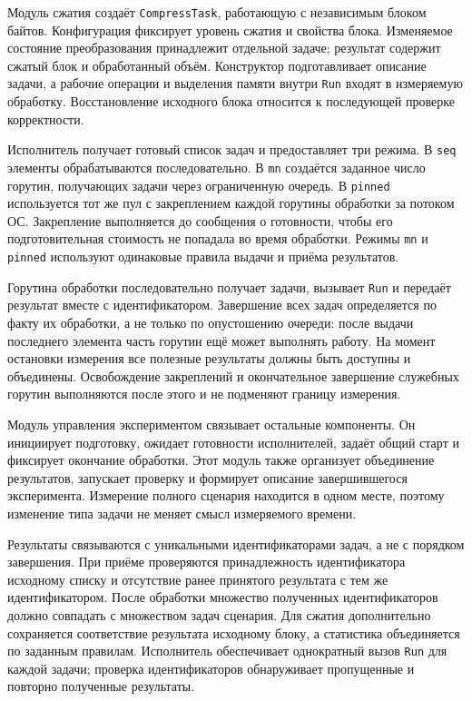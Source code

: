 Модуль сжатия создаёт \texttt{CompressTask}, работающую с независимым блоком байтов.
  Конфигурация фиксирует уровень сжатия и свойства блока. Изменяемое состояние преобразования
  принадлежит отдельной задаче; результат содержит сжатый блок и обработанный объём.
  Конструктор подготавливает описание задачи, а рабочие операции и выделения памяти внутри
  \texttt{Run} входят в измеряемую обработку. Восстановление исходного блока относится
  к последующей проверке корректности.

Исполнитель получает готовый список задач и предоставляет три режима. В \texttt{seq}
  элементы обрабатываются последовательно. В \texttt{mn} создаётся заданное число горутин,
  получающих задачи через ограниченную очередь. В \texttt{pinned} используется тот же пул
  с закреплением каждой горутины обработки за потоком ОС. Закрепление выполняется до сообщения
  о готовности, чтобы его подготовительная стоимость не попадала во время обработки.
  Режимы \texttt{mn} и \texttt{pinned} используют одинаковые правила выдачи и приёма результатов.

Горутина обработки последовательно получает задачи, вызывает \texttt{Run} и передаёт результат
  вместе с идентификатором. Завершение всех задач определяется по факту их обработки,
  а не только по опустошению очереди: после выдачи последнего элемента часть горутин ещё может
  выполнять работу. На момент остановки измерения все полезные результаты должны быть доступны
  и объединены. Освобождение закреплений и окончательное завершение служебных горутин выполняются
  после этого и не подменяют границу измерения.

Модуль управления экспериментом связывает остальные компоненты. Он инициирует подготовку,
  ожидает готовности исполнителей, задаёт общий старт и фиксирует окончание обработки.
  Этот модуль также организует объединение результатов, запускает проверку и формирует описание
  завершившегося эксперимента. Измерение полного сценария находится в одном месте, поэтому
  изменение типа задачи не меняет смысл измеряемого времени.

Результаты связываются с уникальными идентификаторами задач, а не с порядком завершения.
  При приёме проверяются принадлежность идентификатора исходному списку и отсутствие ранее
  принятого результата с тем же идентификатором. После обработки множество полученных
  идентификаторов должно совпадать с множеством задач сценария. Для сжатия дополнительно
  сохраняется соответствие результата исходному блоку, а статистика объединяется по заданным
  правилам. Исполнитель обеспечивает однократный вызов \texttt{Run} для каждой задачи;
  проверка идентификаторов обнаруживает пропущенные и повторно полученные результаты.


